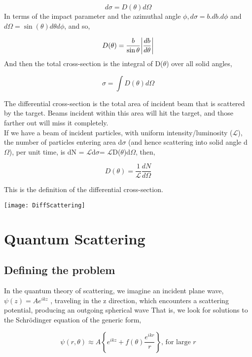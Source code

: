 \begin{equation}
	d\sigma=D(\theta)d\Omega
\end{equation}
In terms of the impact parameter and the azimuthal angle $\phi, d\sigma = b.db.d\phi$ and $d\Omega=\sin(\theta)d\theta d\phi$, and so,

\begin{equation}
	D(\theta)=\frac{b}{\sin\theta}\abs{\frac{db}{d\theta}}
\end{equation}
And then the total cross-section is the integral of D($\theta$) over all solid angles,

\begin{equation}
	\sigma=\int D(\theta)d\Omega
\end{equation}

The differential cross-section is the total area of incident beam that is scattered by the target. Beams incident within this area will hit the target, and those farther out will miss it completely.\\
If we have a beam of incident particles, with uniform intensity/luminosity ($\mathcal{L}$), the number of particles entering area d$\sigma$ (and hence scattering into solid angle d$\Omega$), per unit time, is dN = $\mathcal{L}$d$\sigma$= $\mathcal{L}$D($\theta$)d$\Omega$, then,

\begin{equation}
	D(\theta)=\frac{1}{\mathcal{L}}\frac{dN}{d\Omega}
\end{equation}

This is the definition of the differential cross-section.

\begin{center}
	\texttt{[image: DiffScattering]}
\end{center}
\newpage


\section{Quantum Scattering}
\subsection{Defining the problem}
In the quantum theory of scattering, we imagine an incident plane wave,$\psi(z)=Ae^{ikz}$ , traveling in the z
direction, which encounters a scattering potential, producing an outgoing spherical wave That is, we look for solutions to the Schrödinger equation of the generic form,

\begin{equation}
	\psi(r,\theta)\approx A\left\{e^{ikz}+f(\theta)\frac{e^{ikr}}{r}\right\} \textrm{,	for large $r$}
\end{equation}

